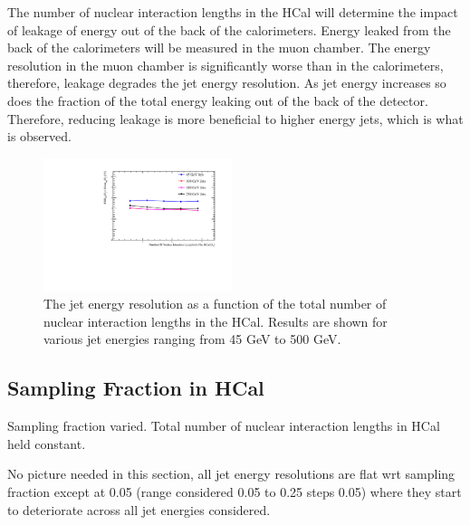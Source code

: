 \documentclass[final,3p,times,twocolumn]{elsarticle}
\begin{document}
The number of nuclear interaction lengths in the HCal will determine the impact of leakage of energy out of the back of the calorimeters.  Energy leaked from the back of the calorimeters will be measured in the muon chamber.  The energy resolution in the muon chamber is significantly worse than in the calorimeters, therefore, leakage degrades the jet energy resolution.  As jet energy increases so does the fraction of the total energy leaking out of the back of the detector.  Therefore, reducing leakage is more beneficial to higher energy jets, which is what is observed.

\begin{figure}[!h]
  \begin{center}
     \includegraphics[width=0.49\textwidth]{6_HCalParamScan/JER_vs_NumberOfNuclearInterationLengthsInTheHCal.pdf}
     \caption{The jet energy resolution as a function of the total number of nuclear interaction lengths in the HCal.  Results are shown for various jet energies ranging from 45 GeV to 500 GeV.\label{HCalDepth}}
  \end{center}
\end{figure}

\subsection{Sampling Fraction in HCal}


Sampling fraction varied.  Total number of nuclear interaction lengths in HCal held constant. 

No picture needed in this section, all jet energy resolutions are flat wrt sampling fraction except at 0.05 (range considered 0.05 to 0.25 steps 0.05) where they start to 
deteriorate across all jet energies considered.  

\end{document}
